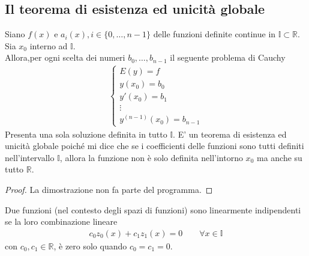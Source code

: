 \documentclass[a4paper, oneside]{book}
\begin{document}
\subsection{Il teorema di esistenza ed unicità globale}
\begin{theorem}
    Siano $f(x)$ e $a_i(x), i \in \{0, \dots, n - 1\}$ delle funzioni definite continue in $\mathbb{I} \subset \mathbb{R}$. \\
    Sia $x_0$ interno ad $\mathbb{I}$. \\
    Allora,per ogni scelta dei numeri $b_0, \dots, b_{n - 1}$ il seguente problema di Cauchy 
    \begin{gather*}
        \left\{\begin{array}{l}
            E(y) = f \\
            y(x_0) = b_0 \\
            y'(x_0) = b_1 \\
            \vdots \\
            y^{(n - 1)}(x_0) = b_{n - 1} 
        \end{array}\right.
    \end{gather*}
    Presenta una sola soluzione definita in tutto $\mathbb{I}$. E' un teorema di esistenza
    ed unicità globale poiché mi dice che se i coefficienti delle funzioni sono tutti
    definiti nell'intervallo $\mathbb{I}$, allora la funzione non è solo definita nell'intorno $x_0$
    ma anche su tutto $\mathbb{R}$.
\end{theorem}
\begin{proof}
    La dimostrazione non fa parte del programma. 
\end{proof}

\begin{definition}
    Due funzioni (nel contesto degli spazi di funzioni) sono linearmente
    indipendenti se la loro combinazione lineare
    \begin{gather*}
        c_0z_0(x) + c_1z_1(x) = 0 \qquad \forall x \in \mathbb{I}
    \end{gather*} 
    con $c_0, c_1 \in \mathbb{R}$, è zero solo quando $c_0 = c_1 = 0$.  
\end{definition}
\end{document}
